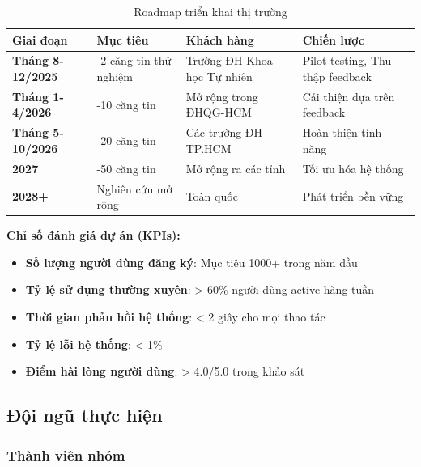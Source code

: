 \documentclass[12pt,a4paper]{article}
\begin{document}
\begin{table}[H]
\centering
\caption{Roadmap triển khai thị trường}
\label{tab:go-to-market}
\begin{tabular}{@{}>{\raggedright\arraybackslash}p{2cm}>{\raggedright\arraybackslash}p{4cm}>{\raggedright\arraybackslash}p{3cm}>{\raggedright\arraybackslash}p{4cm}@{}}
\toprule
\textbf{Giai đoạn} & \textbf{Mục tiêu} & \textbf{Khách hàng} & \textbf{Chiến lược} \\
\midrule
\textbf{Tháng 8-12/2025} & 1-2 căng tin thử nghiệm & Trường ĐH Khoa học Tự nhiên & Pilot testing, Thu thập feedback \\
\textbf{Tháng 1-4/2026} & 5-10 căng tin & Mở rộng trong ĐHQG-HCM & Cải thiện dựa trên feedback \\
\textbf{Tháng 5-10/2026} & 15-20 căng tin & Các trường ĐH TP.HCM & Hoàn thiện tính năng \\
\textbf{2027} & 30-50 căng tin & Mở rộng ra các tỉnh & Tối ưu hóa hệ thống \\
\textbf{2028+} & Nghiên cứu mở rộng & Toàn quốc & Phát triển bền vững \\
\bottomrule
\end{tabular}
\end{table}

\textbf{Chỉ số đánh giá dự án (KPIs):}
\begin{itemize}[leftmargin=1cm]
    \item \textbf{Số lượng người dùng đăng ký}: Mục tiêu 1000+ trong năm đầu
    \item \textbf{Tỷ lệ sử dụng thường xuyên}: > 60\% người dùng active hàng tuần
    \item \textbf{Thời gian phản hồi hệ thống}: < 2 giây cho mọi thao tác
    \item \textbf{Tỷ lệ lỗi hệ thống}: < 1\%
    \item \textbf{Điểm hài lòng người dùng}: > 4.0/5.0 trong khảo sát
\end{itemize}

\subsection{Đội ngũ thực hiện}

\subsubsection{Thành viên nhóm}
\end{document}
